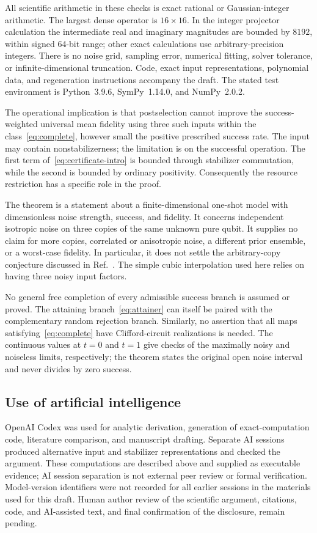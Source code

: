 \documentclass[aps,pra,reprint,amsmath,amssymb,longbibliography,nofootinbib]{revtex4-2}
\begin{document}
All scientific arithmetic in these checks is exact rational or Gaussian-integer arithmetic. The largest dense operator is $16\times16$. In the integer projector calculation the intermediate real and imaginary magnitudes are bounded by $8192$, within signed 64-bit range; other exact calculations use arbitrary-precision integers. There is no noise grid, sampling error, numerical fitting, solver tolerance, or infinite-dimensional truncation. Code, exact input representations, polynomial data, and regeneration instructions accompany the draft. The stated test environment is Python~3.9.6, SymPy~1.14.0, and NumPy~2.0.2.

The operational implication is that postselection cannot improve the success-weighted universal mean fidelity using three such inputs within the class~\eqref{eq:complete}, however small the positive prescribed success rate. The input may contain nonstabilizerness; the limitation is on the successful operation. The first term of~\eqref{eq:certificate-intro} is bounded through stabilizer commutation, while the second is bounded by ordinary positivity. Consequently the resource restriction has a specific role in the proof.

The theorem is a statement about a finite-dimensional one-shot model with dimensionless noise strength, success, and fidelity. It concerns independent isotropic noise on three copies of the same unknown pure qubit. It supplies no claim for more copies, correlated or anisotropic noise, a different prior ensemble, or a worst-case fidelity. In particular, it does not settle the arbitrary-copy conjecture discussed in Ref.~\cite{He2025NoGo}. The simple cubic interpolation used here relies on having three noisy input factors.

No general free completion of every admissible success branch is assumed or proved. The attaining branch~\eqref{eq:attainer} can itself be paired with the complementary random rejection branch. Similarly, no assertion that all maps satisfying~\eqref{eq:complete} have Clifford-circuit realizations is needed. The continuous values at $t=0$ and $t=1$ give checks of the maximally noisy and noiseless limits, respectively; the theorem states the original open noise interval and never divides by zero success.

\subsection{Use of artificial intelligence}

OpenAI Codex was used for analytic derivation, generation of exact-computation code, literature comparison, and manuscript drafting. Separate AI sessions produced alternative input and stabilizer representations and checked the argument. These computations are described above and supplied as executable evidence; AI session separation is not external peer review or formal verification. Model-version identifiers were not recorded for all earlier sessions in the materials used for this draft. Human author review of the scientific argument, citations, code, and AI-assisted text, and final confirmation of the disclosure, remain pending.
\end{document}
